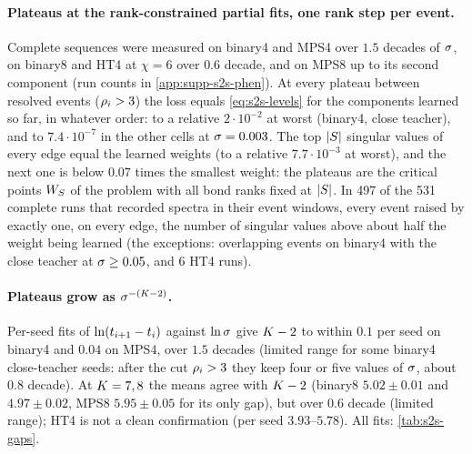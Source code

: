 \paragraph{Plateaus at the rank-constrained partial fits, one rank step per event.}
\empirical{} Complete sequences were measured on binary4 and MPS4 over $1.5$ decades of $\sigma$, on binary8 and
HT4 at $\chi=6$ over $0.6$ decade, and on MPS8 up to its second component (run counts in
\cref{app:supp-s2s-phen}). At every plateau between resolved events ($\rho_{i}>3$) the loss equals
\eqref{eq:s2s-levels} for the components learned so far, in whatever order: to a relative $2\cdot10^{-2}$ at
worst (binary4, close teacher), and to $7.4\cdot10^{-7}$ in the other cells at $\sigma=0.003$. The top $\lvert S\rvert$
singular values of every edge equal the learned weights (to a relative $7.7\cdot10^{-3}$ at worst), and the
next one is below $0.07$ times the smallest weight: the plateaus are the critical points $W_S$ of the problem
with all bond ranks fixed at $\lvert S\rvert$. In 497
of the 531 complete runs that recorded spectra in their event windows, every event raised by exactly one, on
every edge, the number of singular values above about half the weight being learned (the exceptions:
overlapping events on binary4 with the close teacher at $\sigma\ge0.05$, and 6 HT4 runs).

\paragraph{Plateaus grow as $\sigma^{-(K-2)}$.}
\empirical{} Per-seed fits of $\ln(t_{i+1}-t_{i})$ against $\ln\sigma$ give $K-2$ to within $0.1$ per seed on
binary4 and $0.04$ on MPS4, over $1.5$ decades (limited range for some binary4 close-teacher seeds: after the cut
$\rho_{i}>3$ they keep four or five values of $\sigma$, about $0.8$ decade). At $K=7,8$ the means agree with
$K-2$ (binary8 $5.02\pm0.01$ and $4.97\pm0.02$, MPS8 $5.95\pm0.05$ for its only gap), but over $0.6$ decade
(limited range); HT4 is not a clean confirmation (per seed $3.93$--$5.78$). All fits: \cref{tab:s2s-gaps}.

